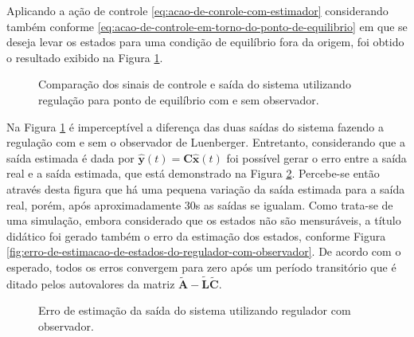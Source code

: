 Aplicando a ação de controle \ref{eq:acao-de-conrole-com-estimador} considerando
também conforme \ref{eq:acao-de-controle-em-torno-do-ponto-de-equilibrio} em que
se deseja levar os estados para uma condição de equilíbrio fora da origem, foi
obtido o resultado exibido na Figura \ref{fig:resultado-do-regulador-com-observador}.

\begin{figure}[!htp]
    \caption{Comparação dos sinais de controle e saída do sistema utilizando
    regulação para ponto de equilíbrio com e sem observador.}
    \vspace{-10pt}
    \hspace{-30pt}
    \label{fig:resultado-do-regulador-com-observador}
    \begin{minipage}{\linewidth}
        
    \end{minipage}
\end{figure}

Na Figura \ref{fig:resultado-do-regulador-com-observador} é imperceptível a
diferença das duas saídas do sistema fazendo a regulação com e sem o observador
de Luenberger. Entretanto, considerando que a saída estimada é dada por
$\mathbf{\hat{y}}(t) = \mathbf{C}\mathbf{\hat{x}}(t)$ foi possível gerar o erro
entre a saída real e a saída estimada, que está demonstrado na Figura
\ref{fig:erro-de-estimacao-de-estados-regulador-da-saida}. Percebe-se então
através desta figura que há uma pequena variação da saída estimada para a saída
real, porém, após aproximadamente 30s as saídas se igualam. Como trata-se de uma
simulação, embora considerado que os estados não são mensuráveis, a título
didático foi gerado também o erro da estimação dos estados, conforme Figura
\ref{fig:erro-de-estimacao-de-estados-do-regulador-com-observador}. De acordo
com o esperado, todos os erros convergem para zero após um período transitório
que é ditado pelos autovalores da matriz
$\mathbf{\tilde{A}}-\mathbf{\tilde{L}}\mathbf{\tilde{C}}$.

\begin{figure}[!h]
    \caption{Erro de estimação da saída do sistema utilizando regulador com
    observador.}
    \vspace{-10pt}
    \hspace{-30pt}
    \label{fig:erro-de-estimacao-de-estados-regulador-da-saida}
    \begin{minipage}{\linewidth}
        
    \end{minipage}
\end{figure}

